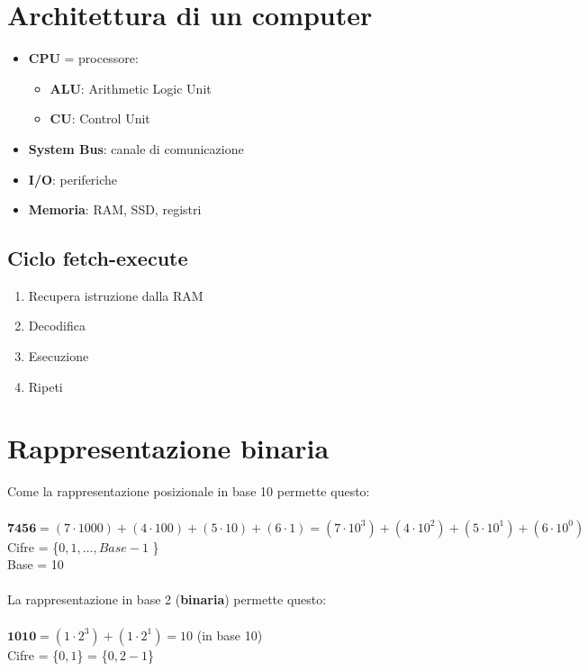 \documentclass[12pt]{article}
\let\oldsection\section
\renewcommand{\section}{\clearpage\oldsection}
\begin{document}
\section{Architettura di un computer}

\begin{itemize}
  \item \textbf{CPU} = processore:
    \begin{itemize}
      \item \textbf{ALU}: Arithmetic Logic Unit
      \item \textbf{CU}: Control Unit
    \end{itemize}
  \item \textbf{System Bus}: canale di comunicazione
  \item \textbf{I/O}: periferiche
  \item \textbf{Memoria}: RAM, SSD, registri
\end{itemize}

\subsection{Ciclo fetch-execute}
\begin{enumerate}
  \item Recupera istruzione dalla RAM
  \item Decodifica
  \item Esecuzione
  \item Ripeti
\end{enumerate}

\section{Rappresentazione binaria}
Come la rappresentazione posizionale in base 10 permette questo:\\\\
$\textbf{7456} = (7 \cdot 1000) + (4 \cdot 100) + ( 5 \cdot 10) + (6 \cdot 1 ) = (7 \cdot 10^3) + (4 \cdot 10^2) + (5 \cdot 10^1) + (6 \cdot 10^0)$\\
Cifre = \{$0,1,\ldots,Base-1$ \}\\
Base = 10\\\\
La rappresentazione in base 2 (\textbf{binaria}) permette questo:\\\\
$\textbf{1010} = (1 \cdot 2^3) + (1 \cdot 2^1) = 10$ (in base 10)\\
Cifre = \{$0,1$\} = \{$0,2-1$\}\\
\end{document}
